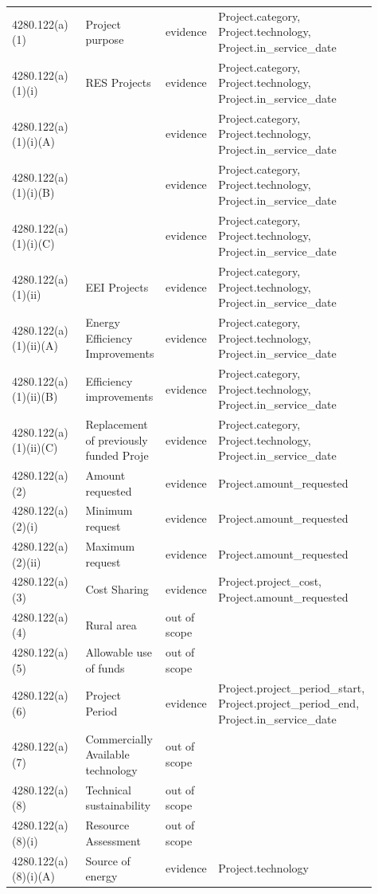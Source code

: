 \begin{longtable}{p{0.2\linewidth}p{0.2\linewidth}p{0.09\linewidth}p{0.42\linewidth}}
4280.122(a)(1) & Project purpose & evidence & Project.category, Project.technology, Project.in\_service\_date \\
4280.122(a)(1)(i) & RES Projects & evidence & Project.category, Project.technology, Project.in\_service\_date \\
4280.122(a)(1)(i)(A) &  & evidence & Project.category, Project.technology, Project.in\_service\_date \\
4280.122(a)(1)(i)(B) &  & evidence & Project.category, Project.technology, Project.in\_service\_date \\
4280.122(a)(1)(i)(C) &  & evidence & Project.category, Project.technology, Project.in\_service\_date \\
4280.122(a)(1)(ii) & EEI Projects & evidence & Project.category, Project.technology, Project.in\_service\_date \\
4280.122(a)(1)(ii)(A) & Energy Efficiency Improvements & evidence & Project.category, Project.technology, Project.in\_service\_date \\
4280.122(a)(1)(ii)(B) & Efficiency improvements & evidence & Project.category, Project.technology, Project.in\_service\_date \\
4280.122(a)(1)(ii)(C) & Replacement of previously funded Proje & evidence & Project.category, Project.technology, Project.in\_service\_date \\
4280.122(a)(2) & Amount requested & evidence & Project.amount\_requested \\
4280.122(a)(2)(i) & Minimum request & evidence & Project.amount\_requested \\
4280.122(a)(2)(ii) & Maximum request & evidence & Project.amount\_requested \\
4280.122(a)(3) & Cost Sharing & evidence & Project.project\_cost, Project.amount\_requested \\
4280.122(a)(4) & Rural area & out of scope &  \\
4280.122(a)(5) & Allowable use of funds & out of scope &  \\
4280.122(a)(6) & Project Period & evidence & Project.project\_period\_start, Project.project\_period\_end, Project.in\_service\_date \\
4280.122(a)(7) & Commercially Available technology & out of scope &  \\
4280.122(a)(8) & Technical sustainability & out of scope &  \\
4280.122(a)(8)(i) & Resource Assessment & out of scope &  \\
4280.122(a)(8)(i)(A) & Source of energy & evidence & Project.technology \\

\end{longtable}
